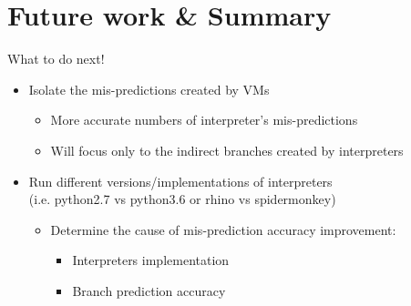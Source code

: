 \documentclass[10pt]{beamer}
\begin{document}
\section{Future work \& Summary}
\begin{frame}{What to do next!}
	\begin{itemize}
		\item {Isolate the mis-predictions created by VMs}
		\begin{itemize}
			\item{More accurate numbers of interpreter's mis-predictions}
			\item{Will focus only to the indirect branches created by interpreters}
		\end{itemize}
		\item {Run different versions/implementations of interpreters\\\small (i.e. python2.7 vs python3.6 or rhino vs spidermonkey)}
			\begin{itemize}
				\item{Determine the cause of mis-prediction accuracy improvement:}
				\begin{itemize}
						\item {Interpreters implementation}
						\item {Branch prediction accuracy}
				\end{itemize}
			\end{itemize}
	\end{itemize}
\end{frame}
\end{document}
